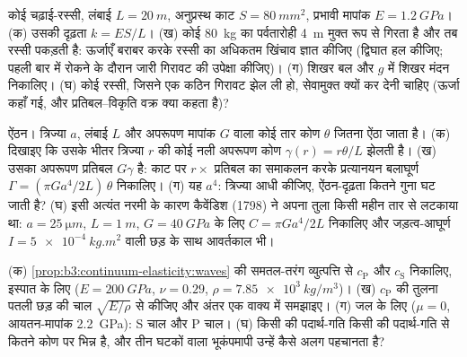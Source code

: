 \begin{exercise}[$\star\star$]\label{exo:b3:continuum-elasticity:7}
कोई चढ़ाई-रस्सी, लंबाई $L = \qty{20}{m}$, अनुप्रस्थ काट $S =
\qty{80}{mm^2}$, प्रभावी मापांक $E = \qty{1.2}{GPa}$। (क) उसकी
दृढ़ता $k = ES/L$। (ख) कोई \qty{80}{kg} का पर्वतारोही
\qty{4}{m} मुक्त रूप से गिरता है और तब रस्सी पकड़ती है: ऊर्जाएँ बराबर
करके रस्सी का अधिकतम खिंचाव ज्ञात कीजिए (द्विघात हल कीजिए; पहली बार में
रोकने के दौरान जारी गिरावट की उपेक्षा कीजिए)। (ग) शिखर बल और
$g$ में शिखर मंदन निकालिए। (घ) कोई रस्सी, जिसने एक कठिन गिरावट झेल ली
हो, सेवामुक्त क्यों कर देनी चाहिए (ऊर्जा कहाँ गई, और
प्रतिबल--विकृति वक्र क्या कहता है)?
\end{exercise}

\begin{exercise}[$\star\star$]\label{exo:b3:continuum-elasticity:8}
ऐंठन। त्रिज्या $a$, लंबाई $L$ और अपरूपण मापांक $G$ वाला कोई तार
कोण $\theta$ जितना ऐंठा जाता है। (क) दिखाइए कि उसके भीतर त्रिज्या $r$
की कोई नली अपरूपण कोण $\gamma(r) = r\theta/L$ झेलती है। (ख) उसका अपरूपण
प्रतिबल $G\gamma$ है: काट पर $r \times$ प्रतिबल का समाकलन करके
प्रत्यानयन बलाघूर्ण $\Gamma = (\pi Ga^4/2L)\,\theta$ निकालिए। (ग) यह $a^4$:
त्रिज्या आधी कीजिए, ऐंठन-दृढ़ता कितने गुना घट जाती है? (घ) इसी अत्यंत
नरमी के कारण कैवेंडिश (1798) ने अपना तुला किसी महीन तार से लटकाया था:
$a = \qty{25}{\micro m}$, $L =
\qty{1}{m}$, $G = \qty{40}{GPa}$ के लिए $C = \pi Ga^4/2L$ निकालिए और
जड़त्व-आघूर्ण $I = \qty{5e-4}{kg.m^2}$ वाली छड़ के साथ आवर्तकाल भी।
\end{exercise}

\begin{exercise}[$\star\star$]\label{exo:b3:continuum-elasticity:9}
(क) \cref{prop:b3:continuum-elasticity:waves} की समतल-तरंग व्युत्पत्ति
से $c_{\text{P}}$ और
$c_{\text{S}}$ निकालिए, इस्पात के लिए ($E = \qty{200}{GPa}$, $\nu = 0.29$, $\rho =
\qty{7.85e3}{kg/m^3}$)। (ख) $c_{\text{P}}$ की तुलना पतली छड़ की चाल
$\sqrt{E/\rho}$ से कीजिए और अंतर एक वाक्य में समझाइए। (ग)
जल के लिए ($\mu = 0$, आयतन-मापांक \qty{2.2}{GPa}): S चाल और
P चाल। (घ) किसी  की पदार्थ-गति किसी  की पदार्थ-गति से
कितने कोण पर भिन्न है, और तीन घटकों वाला भूकंपमापी उन्हें कैसे अलग
पहचानता है?
\end{exercise}


